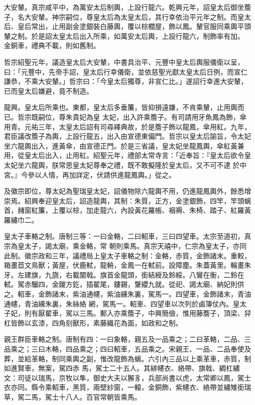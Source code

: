 \begin{pinyinscope}
 大安輦。真宗咸平中，為萬安太后制輿，上設行龍六。乾興元年，詔皇太后御坐簷子，名大安輦。神宗嗣位，尊皇太后為太皇太后，其行幸依治平元年之制。而皇太后、皇后常出，止用副金塗銀裝白藤輿，覆以棕櫚屋，飾以鳳。輦官服同乘輿平頭輦之制。於是詔太皇太后出入所乘，如萬安太后輿，上設行龍六，制飾率有加。
 金銅車，禮典不載，則如舊制。



 哲宗紹聖元年，議造皇太后大安輦，中書具治平、元豐中皇太后輿服儀衛以呈，曰：「元豐中，先帝手詔，皇太后行幸儀衛，並依慈聖光獻太皇太后日例，而宣仁謙恭，不乘大安輦。」哲宗曰：「今皇太后獨尊，非宣仁比。」遂詔行幸進大安輦，已而皇太后嫌避，竟不制造。



 龍興。皇太后所乘也。東都，皇太后多垂簾，皆抑損遠嫌，不肯乘輦，止用輿而已。哲宗既嗣位，尊朱貴妃為皇
 太妃，出入許乘簷子。有司請用牙魚鳳為飾，傘用青。元祐三年，太皇太后詔有司尋繹典故，於是簷子飾以龍鳳，傘用紅。九年，君臣議改簷子為輿，上設行龍五，出入由宣德東偏門。哲宗以皇太后諭旨，令太妃坐六龍輿出入，進黃傘，由宣德正門。於是三省議，皇太妃坐龍鳳輿，傘紅黃兼用，從皇太后出入，止用紅。紹聖元年，禮部太常寺言：「近奉旨：『皇太后欲令皇太妃坐六龍輿，朕常思皇太妃尊奉之禮，既不敢擬隆於皇太后，又不可不逮
 於中宮。』今參以人情，再加詳定，伏請供進龍鳳輿。」從之。



 及徽宗即位，尊太妃為聖瑞皇太妃，詔儀物除六龍輿不用，仍進龍鳳輿外，餘悉增崇焉。紹興奉迎皇太后，詔造龍輿，其制：朱質，正方，金塗銀飾，四竿，竿頭螭首，赭窗紅簾，上覆以棕，加走龍六，內設黃花羅帳、裀褥、朱椅、踏子、紅羅黃羅繡巾二。



 皇太子車輅之制。唐制三等：一曰金輅，二曰軺車，三曰四望車。太宗至道初，真宗為皇太子，謁太廟，乘金輅，常
 朝則乘馬。真宗天禧中，仁宗為皇太子，亦同此制。徽宗政和三年，議禮局上皇太子車輅之制：金輅，赤質，金飾諸末。重較，箱畫苣文鳥獸；黃屋，伏鹿軾，龍輈，金鳳一在軾前。設障塵。朱蓋黃里。輪畫朱牙。左建旗，九旒，右載闟戟。旗首金龍頭，銜結綬及鈴綏。八鸞在衡，二鈴在軾。駕赤騮四，金鍐方釳，插翟尾，鏤錫，鞶纓九就。從祀、謁太廟、納妃則供之。軺車，金飾諸末，紫油通幰，紫油纁朱裏，駕馬一。四望車，金飾諸末，青油通幰，青油纁朱裏，朱絲絡
 網，駕馬一。軺車、四望車以次列於鹵簿仗內。皇太子妃，則有厭翟車，駕以三馬。郵入亦乘簷子，中興簡儉，惟用藤簷子，頂梁、舁杠皆飾以玄漆，四角刻獸形，素藤織花為面，如政和之制。



 親王群臣車輅之制。唐制有四：一曰象輅，親五及一品乘之；二曰革輅，二品、三品乘之；三曰木輅，四品乘之；四曰軺車，五品乘之。宋親王、一品、二品奉使及葬，並給革輅，制同乘輿之副，惟改龍飾為螭。六引內三品以上乘革車，赤質，制如進賢車，無案，駕四赤
 馬，駕士二十五人。其緋幰衣、絡帶、旗戟、綢杠繡文：司徒以瑞馬，京牧以隼，御史大夫以獬豸，兵部尚書以虎，太常卿以鳳，駕士衣亦同。縣令乘軺車，黑質，兩壁紗窗，一轅，金銅飾，紫幰衣、絡帶並繡雉銜瑞草，駕二馬，駕士十八人。百官常朝皆乘馬。




\end{pinyinscope}
